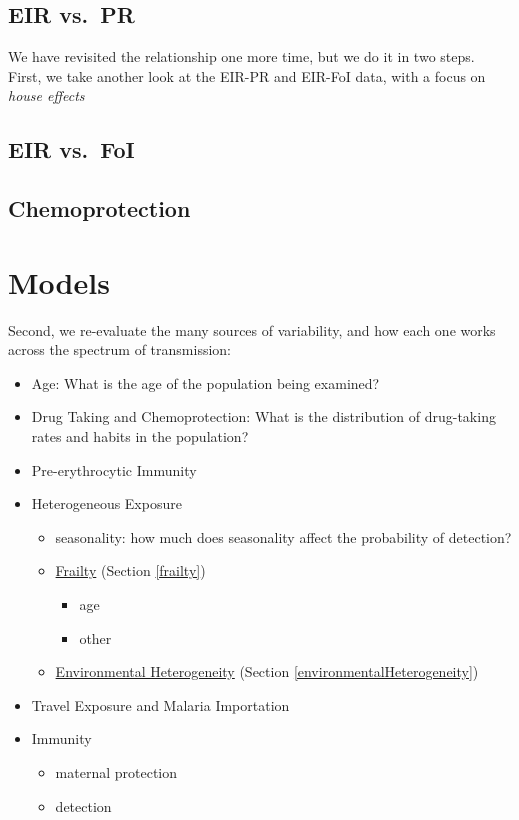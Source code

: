 \documentclass[
]{book}
\begin{document}
\hypertarget{eir-vs.-pr}{%
\subsection{EIR vs.~PR}\label{eir-vs.-pr}}

We have revisited the relationship one more time, but we do it in two steps. First, we take another look at the EIR-PR and EIR-FoI data, with a focus on \emph{house effects}

\hypertarget{eir-vs.-foi}{%
\subsection{EIR vs.~FoI}\label{eir-vs.-foi}}

\hypertarget{chemoprotection-1}{%
\subsection{Chemoprotection}\label{chemoprotection-1}}

\hypertarget{models}{%
\section{Models}\label{models}}

Second, we re-evaluate the many sources of variability, and how each one works across the spectrum of transmission:

\begin{itemize}
\item
  Age: What is the age of the population being examined?
\item
  Drug Taking and Chemoprotection: What is the distribution of drug-taking rates and habits in the population?
\item
  Pre-erythrocytic Immunity
\item
  Heterogeneous Exposure

  \begin{itemize}
  \item
    seasonality: how much does seasonality affect the probability of detection?
  \item
    \protect\hyperlink{frailty}{Frailty} (Section \ref{frailty})

    \begin{itemize}
    \item
      age
    \item
      other
    \end{itemize}
  \item
    \protect\hyperlink{environmentalHeterogeneity}{Environmental Heterogeneity} (Section \ref{environmentalHeterogeneity})
  \end{itemize}
\item
  Travel Exposure and Malaria Importation
\item
  Immunity

  \begin{itemize}
  \item
    maternal protection
  \item
    detection
  \end{itemize}
\end{itemize}
\end{document}
